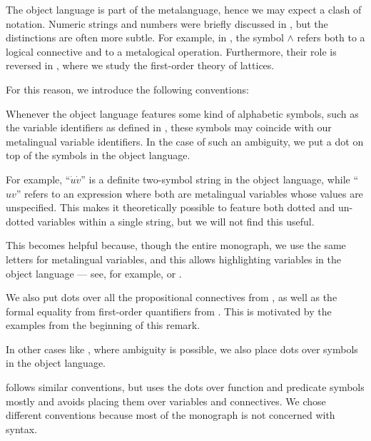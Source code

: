 \begin{remark}\label{rem:object_language_dots}
  The object language is part of the metalanguage, hence we may expect a clash of notation. Numeric strings and numbers were briefly discussed in , but the distinctions are often more subtle. For example, in , the symbol \( \wedge \) refers both to a logical connective and to a metalogical operation. Furthermore, their role is reversed in , where we study the first-order theory of lattices.

  For this reason, we introduce the following conventions:
  \begin{thmenum}
     Whenever the object language features some kind of alphabetic symbols, such as the variable identifiers as defined in , these symbols may coincide with our metalingual variable identifiers. In the case of such an ambiguity, we put a dot on top of the symbols in the object language.

    For example, \enquote{\( \dot u \dot v \)} is a definite two-symbol string in the object language, while \enquote{\( uv \)} refers to an expression where both are metalingual variables whose values are unspecified. This makes it theoretically possible to feature both dotted and un-dotted variables within a single string, but we will not find this useful.

    This becomes helpful because, though the entire monograph, we use the same letters for metalingual variables, and this allows highlighting variables in the object language --- see, for example,  or .

     We also put dots over all the propositional connectives from , as well as the formal equality from first-order quantifiers from . This is motivated by the examples from the beginning of this remark.

     In other cases like , where ambiguity is possible, we also place dots over symbols in the object language.
  \end{thmenum}

   follows similar conventions, but uses the dots over function and predicate symbols mostly and avoids placing them over variables and connectives. We chose different conventions because most of the monograph is not concerned with syntax.
\end{remark}
